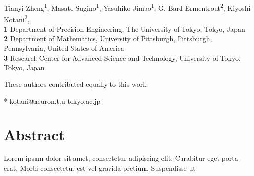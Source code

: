 \documentclass[10pt,letterpaper]{article}
\begin{document}
\vspace*{0.2in}

\begin{flushleft}
{\Large
\textbf{} %
}
\newline
\\
Tianyi Zheng\textsuperscript{1\Yinyang},
Masato Sugino\textsuperscript{1\Yinyang},
Yasuhiko Jimbo\textsuperscript{1},
G. Bard Ermentrout\textsuperscript{2},
Kiyoshi Kotani\textsuperscript{3},
\\
\bigskip
\textbf{1} Department of Precision Engineering, The University of Tokyo, Tokyo, Japan
\\
\textbf{2} Department of Mathematics, University of Pittsburgh, Pittsburgh, Pennsylvania, United States of America
\\
\textbf{3} Research Center for Advanced Science and Technology, University of Tokyo, Tokyo, Japan
\\
\bigskip

% 
%
\Yinyang These authors contributed equally to this work.

* kotani@neuron.t.u-tokyo.ac.jp

\end{flushleft}
\section*{Abstract}
Lorem ipsum dolor sit amet, consectetur adipiscing elit. Curabitur eget porta erat. Morbi consectetur est vel gravida pretium. Suspendisse ut 


\end{document}
